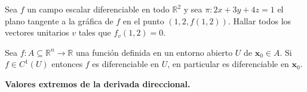 \begin{tarea}
Sea  $f$  un  campo escalar  diferenciable  en todo  $\mathbb{R}^{2}$  y sea   $\pi:  2x+3y+4z=1$   el plano tangente a la gr\'afica de $f$  en el punto $(1,2, f(1,2)).$    Hallar todos los vectores unitarios $v$ tales que $f_v(1,2) = 0.$
\end{tarea}


\begin{theorem} Sea  $f: A\subseteq \mathbb{R}^n \to \mathbb{R}$ una función definida en un entorno abierto $U$ de $\mathbf{x}_0 \in A$. 
Si $f \in C^1(U)$   entonces $f$ es diferenciable en $U$, en particular es diferenciable en $\mathbf{x}_0.$
\end{theorem}

\begin{theorem}\textbf{Valores extremos de la derivada direccional.} \label{teo:max_deriv}
\mbox{}


\end{theorem}

